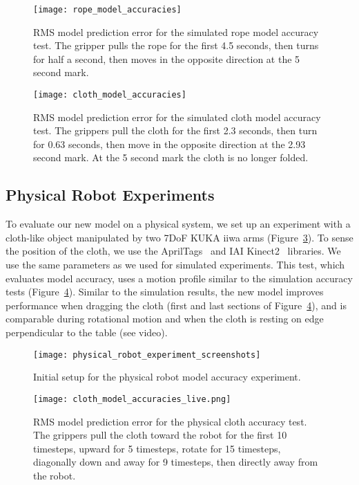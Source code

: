 \begin{figure}[h]
    \centering
    \texttt{[image: rope\_model\_accuracies]}
    \caption{RMS model prediction error for the simulated rope model accuracy test. The gripper pulls the rope for the first 4.5 seconds, then turns for half a second, then moves in the opposite direction at the 5 second mark.}
    \label{fig:rope_model_accuracy_plot}
\end{figure}
\begin{figure}[h]
    \centering
    \texttt{[image: cloth\_model\_accuracies]}
    \caption{RMS model prediction error for the simulated cloth model accuracy test. The grippers pull the cloth for the first 2.3 seconds, then turn for 0.63 seconds, then move in the opposite direction at the 2.93 second mark. At the 5 second mark the cloth is no longer folded. }
    \label{fig:cloth_model_accuracy_plot}
\end{figure}

\FloatBarrier

\subsection{Physical Robot Experiments}

To evaluate our new model on a physical system, we set up an experiment with a cloth-like object manipulated by two 7DoF KUKA iiwa arms (Figure~\ref{fig:physical_experiment_screenshots}). To sense the position of the cloth, we use the AprilTags~\cite{olson2011tags} and IAI Kinect2~\cite{iai_kinect2} libraries. We use the same parameters as we used for simulated experiments. This test, which evaluates model accuracy, uses a motion profile similar to the simulation accuracy tests (Figure~\ref{fig:cloth_model_accuracies_live}). Similar to the simulation results, the new model improves performance when dragging the cloth (first and last sections of Figure~\ref{fig:cloth_model_accuracies_live}), and is comparable during rotational motion and when the cloth is resting on edge perpendicular to the table (see video).

\begin{figure}[h]
    \centering
    \texttt{[image: physical\_robot\_experiment\_screenshots]}
    \caption{Initial setup for the physical robot model accuracy experiment.}
    \label{fig:physical_experiment_screenshots}
\end{figure}
\begin{figure}[h]
    \centering
    \texttt{[image: cloth\_model\_accuracies\_live.png]}
    \caption{RMS model prediction error for the physical cloth accuracy test. The grippers pull the cloth toward the robot for the first 10 timesteps, upward for 5 timesteps, rotate for 15 timesteps, diagonally down and away for 9 timesteps, then directly away from the robot.}
    \label{fig:cloth_model_accuracies_live}
\end{figure}

